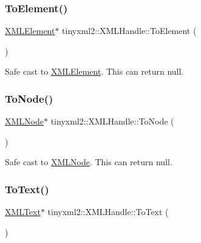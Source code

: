 \subsubsection{\texorpdfstring{To\+Element()}{ToElement()}}
{\footnotesize\ttfamily \mbox{\hyperlink{classtinyxml2_1_1_x_m_l_element}{X\+M\+L\+Element}}$\ast$ tinyxml2\+::\+X\+M\+L\+Handle\+::\+To\+Element (\begin{DoxyParamCaption}{ }\end{DoxyParamCaption})\hspace{0.3cm}{\ttfamily [inline]}}



Safe cast to \mbox{\hyperlink{classtinyxml2_1_1_x_m_l_element}{X\+M\+L\+Element}}. This can return null. 

\mbox{\label{classtinyxml2_1_1_x_m_l_handle_a03ea6ec970a021b71bf1219a0f6717df}} 
\subsubsection{\texorpdfstring{To\+Node()}{ToNode()}}
{\footnotesize\ttfamily \mbox{\hyperlink{classtinyxml2_1_1_x_m_l_node}{X\+M\+L\+Node}}$\ast$ tinyxml2\+::\+X\+M\+L\+Handle\+::\+To\+Node (\begin{DoxyParamCaption}{ }\end{DoxyParamCaption})\hspace{0.3cm}{\ttfamily [inline]}}



Safe cast to \mbox{\hyperlink{classtinyxml2_1_1_x_m_l_node}{X\+M\+L\+Node}}. This can return null. 

\mbox{\label{classtinyxml2_1_1_x_m_l_handle_a6ab9e8cbfb41417246e5657e3842c62a}} 
\subsubsection{\texorpdfstring{To\+Text()}{ToText()}}
{\footnotesize\ttfamily \mbox{\hyperlink{classtinyxml2_1_1_x_m_l_text}{X\+M\+L\+Text}}$\ast$ tinyxml2\+::\+X\+M\+L\+Handle\+::\+To\+Text (\begin{DoxyParamCaption}{ }\end{DoxyParamCaption})\hspace{0.3cm}{\ttfamily [inline]}}



